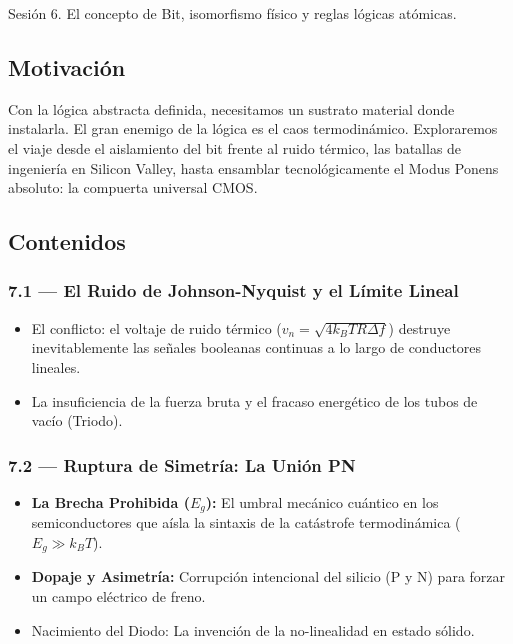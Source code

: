 \documentclass[11pt, letterpaper]{article}
\begin{document}
\begin{prereqs}
Sesi\'on 6. El concepto de Bit, isomorfismo f\'isico y reglas l\'ogicas at\'omicas.
\end{prereqs}

\subsection*{Motivaci\'on}
Con la l\'ogica abstracta definida, necesitamos un sustrato material donde instalarla. El gran enemigo de la l\'ogica es el caos termodin\'amico. Exploraremos el viaje desde el aislamiento del bit frente al ruido t\'ermico, las batallas de ingenier\'ia en Silicon Valley, hasta ensamblar tecnol\'ogicamente el Modus Ponens absoluto: la compuerta universal CMOS.

\subsection{Contenidos}

\subsubsection{7.1 --- El Ruido de Johnson-Nyquist y el L\'imite Lineal}
\begin{itemize}
  \item El conflicto: el voltaje de ruido térmico ($v_n = \sqrt{4k_B TR\Delta f}$) destruye inevitablemente las se\~nales booleanas continuas a lo largo de conductores lineales.
  \item La insuficiencia de la fuerza bruta y el fracaso energ\'etico de los tubos de vac\'io (Triodo).
\end{itemize}

\subsubsection{7.2 --- Ruptura de Simetr\'ia: La Uni\'on PN}
\begin{itemize}
  \item \textbf{La Brecha Prohibida ($E_g$):} El umbral mec\'anico cu\'antico en los semiconductores que a\'isla la sintaxis de la cat\'astrofe termodin\'amica ($E_g \gg k_B T$).
  \item \textbf{Dopaje y Asimetr\'ia:} Corrupci\'on intencional del silicio (P y N) para forzar un campo el\'ectrico de freno.
  \item Nacimiento del Diodo: La invenci\'on de la no-linealidad en estado s\'olido.
\end{itemize}
\end{document}
